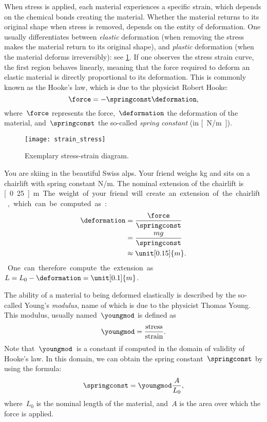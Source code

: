 When stress is applied, each material experiences a specific strain, which depends on the chemical bonds creating the material.
Whether the material returns to its original shape when stress is removed, depends on the entity of deformation.
One usually differentiates between \emph{elastic} deformation (when removing the stress makes the material return to its original shape), and \emph{plastic} deformation (when the material deforms irreversibly): see \cref{fig:stress_strain}.
If one observes the stress \vs strain curve, the first region behaves linearly, meaning that the force required to deform an elastic material is directly proportional to its deformation.
This is commonly known as the Hooke's law, which is due to the physicist Robert Hooke:
\begin{equation*}
    \force=-\springconst \deformation,
\end{equation*}
where~$\force$ represents the force,~$\deformation$ the deformation of the material, and~$\springconst$ the so-called \emph{spring constant} (in \unit[]{[N/m]}).

\begin{figure}[h]
    \centering
    \texttt{[image: strain\_stress]}
    \caption{Exemplary stress-strain diagram. }
    \label{fig:stress_strain}
\end{figure}

\begin{example}
    You are skiing in the beautiful Swiss alps.
    Your friend weighs \unit[100]{kg} and sits on a chairlift with spring constant \unit[4,000]{N/m}.
    The nominal extension of the chairlift is \unit[0.25]{m}.
    The weight of your friend will create an extension of the chairlift, which can be computed as:
    \begin{equation*}
        \begin{aligned}
            \deformation & =\frac{\force}{\springconst} \\
                         & =\frac{mg}{\springconst}     \\
                         & \approx \unit[0.15]{m}.      
        \end{aligned}
    \end{equation*}
    One can therefore compute the extension as~$L=L_0-\deformation=\unit[0.1]{m}$.
\end{example}

The ability of a material to being deformed elastically is described by the so-called Young's \emph{modulus}, name of which is due to the physicist Thomas Young.
This modulus, usually named~$\youngmod$ is defined as
\begin{equation*}
    \youngmod=\frac{\text{stress}}{\text{strain}}.
\end{equation*}
Note that~$\youngmod$~is a constant if computed in the domain of validity of Hooke's law.
In this domain, we can obtain the spring constant~$\springconst$ by using the formula:
\begin{equation*}
    \springconst=\youngmod \frac{A}{L_0},
\end{equation*}
where~$L_0$ is the nominal length of the material, and~$A$ is the area over which the force is applied.

